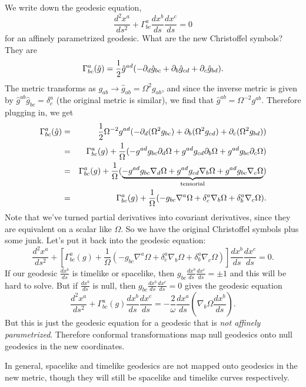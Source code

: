 We write down the geodesic equation,
$$\frac{d^2x^a}{ds^2}+\Gamma^a_{bc} \frac{dx^b}{ds}\frac{dx^c}{ds}=0$$ for an affinely parametrized geodesic. What are the new Christoffel symbols? They are
$$\Gamma^a_{bc}(\hat g)=\frac{1}{2} \hat g^{ad}(-\partial_d \hat g_{bc}+\partial_b \hat g_{cd}+\partial_c \hat g_{bd}).$$
The metric transforms as $g_{ab}\to \hat g_{ab}=\Omega^2 g_{ab}$, and since the inverse metric is given by $\hat g^{ab}\hat g_{bc}=\delta^a_c$ (the original metric is similar), we find that $\hat g^{ab}=\Omega^{-2} g^{ab}.$ Therefore plugging in, we get
\begin{eqnarray*}
\Gamma^a_{bc}(\hat g)&=&\frac{1}{2} \Omega^{-2} g^{ad}(-\partial_d(\Omega^2 g_{bc})+\partial_b(\Omega^2 g_{cd})+\partial_c(\Omega^2 g_{bd}))\\
&=&\Gamma^a_{bc}(g)+\frac{1}{\Omega}(-g^{ad}g_{bc} \partial_d \Omega + g^{ad}g_{cd} \partial_b \Omega + g^{ad} g_{bc}\partial_c \Omega)\\
&=&\Gamma^a_{bc}(g)+\frac{1}{\Omega}(\underbrace{-g^{ad}g_{bc} \nabla_d \Omega + g^{ad}g_{cd} \nabla_b \Omega + g^{ad} g_{bc}\nabla_c \Omega}_{\text{tensorial}})\\
&=&\Gamma^a_{bc}(g)+\frac{1}{\Omega}(-g_{bc}\nabla^a \Omega +\delta^a_c \nabla_b \Omega +\delta^a_b \nabla_c \Omega).
\end{eqnarray*}
Note that we've turned partial derivatives into covariant derivatives, since they are equivalent on a scalar like $\Omega$. So we have the original Christoffel symbols plus some junk. Let's put it back into the geodesic equation:
$$\frac{d^2x^a}{ds^2}+\left[\Gamma^a_{bc}(g)+\frac{1}{\Omega}(-g_{bc}\nabla^a \Omega +\delta^a_c \nabla_b \Omega +\delta^a_b \nabla_c \Omega)\right]\frac{dx^b}{ds}\frac{dx^c}{ds}=0.$$
If our geodesic $\frac{dx^b}{ds}$ is timelike or spacelike, then $g_{bc}\frac{dx^b}{ds}\frac{dx^c}{ds}=\pm 1$ and this will be hard to solve. But if $\frac{dx^b}{ds}$ is null, then $g_{bc}\frac{dx^b}{ds}\frac{dx^c}{ds}=0$ gives the geodesic equation
$$\frac{d^2x^a}{ds^2}+\Gamma^a_{bc}(g)\frac{dx^b}{ds}\frac{dx^c}{ds}=-\frac{2}{\omega}\frac{dx^a}{ds}\left(\nabla_b \Omega \frac{dx^b}{ds}\right).$$
But this is just the geodesic equation for a geodesic that is \emph{not affinely parametrized}. Therefore conformal transformations map null geodesics onto null geodesics in the new coordinates.

In general, spacelike and timelike geodesics are not mapped onto geodesics in the new metric, though they will still be spacelike and timelike curves respectively.